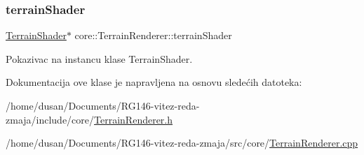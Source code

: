 \subsubsection{\texorpdfstring{terrain\+Shader}{terrainShader}}
{\footnotesize\ttfamily \hyperlink{classshader_1_1TerrainShader}{Terrain\+Shader}$\ast$ core\+::\+Terrain\+Renderer\+::terrain\+Shader\hspace{0.3cm}{\ttfamily [private]}}



Pokazivac na instancu klase Terrain\+Shader. 



Dokumentacija ove klase je napravljena na osnovu sledećih datoteka\+:\begin{DoxyCompactItemize}
\item 
/home/dusan/\+Documents/\+R\+G146-\/vitez-\/reda-\/zmaja/include/core/\hyperlink{TerrainRenderer_8h}{Terrain\+Renderer.\+h}\item 
/home/dusan/\+Documents/\+R\+G146-\/vitez-\/reda-\/zmaja/src/core/\hyperlink{TerrainRenderer_8cpp}{Terrain\+Renderer.\+cpp}\end{DoxyCompactItemize}
